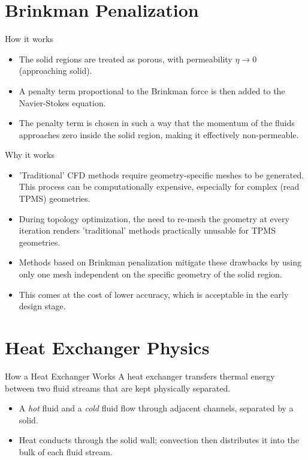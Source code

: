 \documentclass{beamer}
\begin{document}
	\section{Brinkman Penalization}
	\begin{frame}{How it works}



	\begin{itemize}
		\item The solid regions are treated as porous, with permeability $\eta\to 0$ (approaching solid).
		\item A penalty term proportional to the Brinkman force is then added to the Navier-Stokes equation. 
		\item The penalty term is chosen in such a way that the momentum of the fluids approaches zero inside the solid region, making it effectively non-permeable. 
	\end{itemize}
	\end{frame}
	\begin{frame}{Why it works}
		\begin{itemize}
			\item 'Traditional' CFD methods require geometry-specific meshes to be generated. This process can be computationally expensive, especially for complex (read TPMS) geometries. 
			\item During topology optimization, the need to re-mesh the geometry at every iteration renders 'traditional' methods practically unusable for TPMS geometries. 
			\item Methods based on Brinkman penalization mitigate these drawbacks by using only one mesh independent on the specific geometry of the solid region. 
			\item This comes at the cost of lower accuracy, which is acceptable in the early design stage. 
		\end{itemize}
	\end{frame}
	
	\section{Heat Exchanger Physics}
	
	\begin{frame}{How a Heat Exchanger Works}
		A heat exchanger transfers thermal energy between two fluid streams that are kept physically separated.
		\begin{itemize}
			\item A \emph{hot} fluid and a \emph{cold} fluid flow through adjacent channels, separated by a solid.
			\item Heat conducts through the solid wall; convection then distributes it into the bulk of each fluid stream.
		\end{itemize}
	\end{frame}
	
\end{document}
